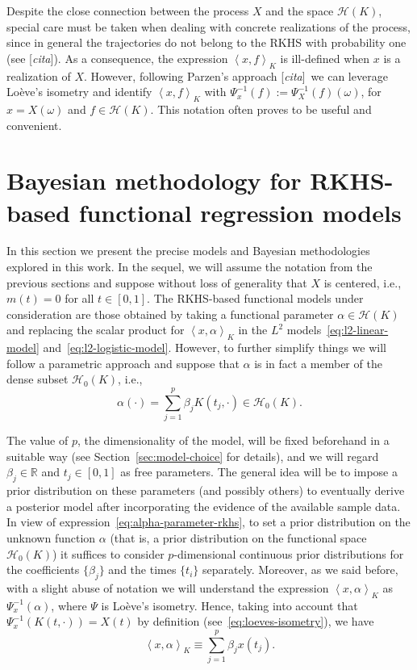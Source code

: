 \documentclass[ba]{imsart}
\numberwithin{equation}{section}
\theoremstyle{plain}
\newcommand{\R}{\mathbb{R}}
\newcommand\dotprod[2]{\left\langle #1, #2 \right\rangle}
\newcommand\incomment[1]{\color{red}[\textit{#1}]\color{black}}
\begin{document}
Despite the close connection between the process \(X\) and the space \(\mathcal H(K)\), special care must be taken when dealing with concrete realizations of the process, since in general the trajectories do not belong to the RKHS with probability one (see \incomment{cita}). As a consequence, the expression \(\dotprod{x}{f}_K\) is ill-defined when \(x\) is a realization of \(X\). However, following Parzen's approach \incomment{cita}\ we can leverage Loève's isometry and identify \(\dotprod{x}{f}_K \) with \( \Psi_x^{-1}(f) := \Psi_X^{-1}(f)(\omega)\), for \(x=X(\omega)\) and \(f\in \mathcal H(K)\). This notation often proves to be useful and convenient.

\section{Bayesian methodology for RKHS-based functional regression models}\label{sec:methodology}

In this section we present the precise models and Bayesian methodologies explored in this work. In the sequel, we will assume the notation from the previous sections and suppose without loss of generality that \(X\) is centered, i.e., \(m(t)=0\) for all \(t\in[0, 1]\). The RKHS-based functional models under consideration are those obtained by taking a functional parameter \(\alpha \in \mathcal H(K)\) and replacing the scalar product for \(\dotprod{x}{\alpha}_K\) in the \(L^2\) models~\eqref{eq:l2-linear-model} and~\eqref{eq:l2-logistic-model}. However, to further simplify things we will follow a parametric approach and suppose that \(\alpha\) is in fact a member of the dense subset \(\mathcal H_0(K)\), i.e.,
\begin{equation}\label{eq:alpha-parameter-rkhs}
  \alpha(\cdot) = \sum_{j=1}^p \beta_j K(t_j, \cdot) \in \mathcal H_0(K).
\end{equation}

The value of \(p\), the dimensionality of the model, will be fixed beforehand in a suitable way (see Section~\ref{sec:model-choice} for details), and we will regard \(\beta_j \in \R\) and \(t_j \in [0, 1]\) as free parameters. The general idea will be to impose a prior distribution on these parameters (and possibly others) to eventually derive a posterior model after incorporating the evidence of the available sample data. In view of expression~\eqref{eq:alpha-parameter-rkhs}, to set a prior distribution on the unknown function \(\alpha\) (that is, a prior distribution on the functional space \(\mathcal H_0(K)\)) it suffices to consider \(p\)-dimensional continuous prior distributions for the coefficients \(\{\beta_j\}\) and the times \(\{t_i\}\) separately. Moreover, as we said before, with a slight abuse of notation we will understand the expression \(\dotprod{x}{\alpha}_K\) as \(\Psi_x^{-1}(\alpha)\), where \(\Psi\) is Loève's isometry. Hence, taking into account that \(\Psi_x^{-1}(K(t, \cdot)) = X(t)\) by definition (see~\eqref{eq:loeves-isometry}), we have
\[
\dotprod{x}{\alpha}_K \equiv \sum_{j=1}^p \beta_j x(t_j).
\]
\end{document}
